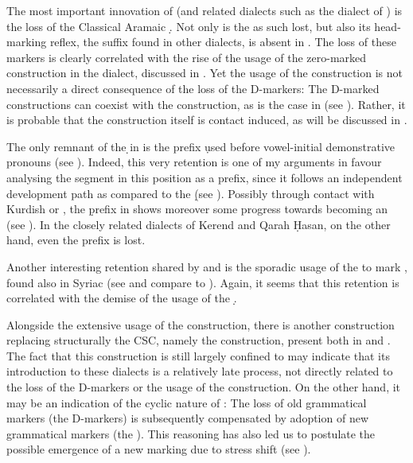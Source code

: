The most important innovation of \JSan (and related dialects such as the dialect of \Ker) is the loss of the Classical Aramaic \lnk* \d. Not only is the \lnk* as such lost, but also its head-marking reflex, the \ed \cst* suffix found in other dialects, is absent in \JSan. The loss of these markers is clearly correlated with the rise of the usage of the zero-marked  construction in the dialect, discussed in . Yet   the usage of the  construction is not necessarily a direct consequence of the loss of the D-markers: The D-marked constructions can coexist with the  construction, as is the case in \JSul (see ). Rather, it is probable that the  construction itself is contact induced, as will be discussed in .

\newpage  
The only remnant of the \d \lnk* in \JSan is  the \gen* prefix \d used before vowel-initial demonstrative pronouns (see ). Indeed, this very retention is one of my arguments in favour analysing the \phonetic[d] segment in this position as a \gen* prefix, since it follows an independent development path as compared to the \lnk* \d (see ). Possibly through contact with Kurdish or \Hawr, the \d prefix in \JSan shows moreover some progress towards becoming an \obl* {} (see ). In the closely related dialects of Kerend and Qarah Ḥasan, on the other hand, even the \gen* prefix  is lost. 

Another interesting retention shared by \JSan and \JSul is the sporadic usage of the   to mark \secns, found also in Syriac (see  and compare to ). Again, it seems that this retention is correlated with the demise of the usage of the \lnk* \d.


Alongside the extensive usage of the  construction, there is another construction replacing structurally the  CSC, namely the  \ez* construction, present both in  \JSul and \JSan. The fact that this construction is still largely confined to  may indicate that its introduction to these dialects is a relatively late process, not directly related to the loss of the D-markers or the usage of the  construction. On the other hand, it may be an indication of the cyclic nature of : The loss of old grammatical markers (the D-markers) is subsequently compensated by adoption of new grammatical markers (the \ez*). This reasoning has also led us to postulate the possible emergence of a new \cst* marking due to stress shift (see ).

